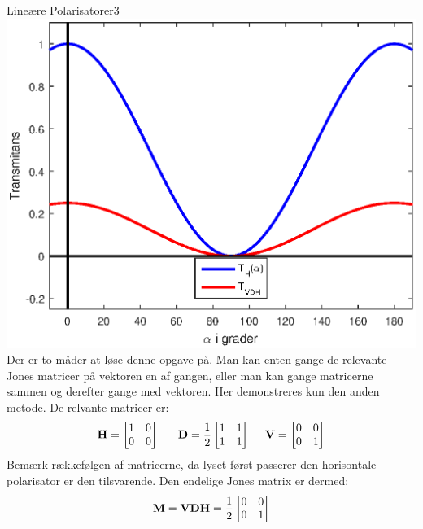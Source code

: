\begin{opgave}{Lineære Polarisatorer}{3}
%
\includegraphics[scale=1]{elektrodynamik/Emskitse.eps}
\opg
Der er to måder at løse denne opgave på. Man kan enten gange de relevante Jones matricer på vektoren en af gangen, eller man kan gange matricerne sammen og derefter gange med vektoren. Her demonstreres kun den anden metode.
De relvante matricer er:
$$
\mathbf{H} = \begin{bmatrix}
1&0\\0&0
\end{bmatrix}
~~~~~\mathbf{D}=
\frac{1}{2}\begin{bmatrix}
1&1\\1&1
\end{bmatrix}
~~~~\mathbf{V} = \begin{bmatrix}
0&0\\0&1
\end{bmatrix}
$$
Bemærk rækkefølgen af matricerne, da lyset først passerer den horisontale polarisator er den tilsvarende. Den endelige Jones matrix er dermed:
$$
\mathbf{M} = \mathbf{VDH}=
\frac{1}{2}
\begin{bmatrix}
0&0\\0&1
\end{bmatrix}
$$
\end{opgave}

